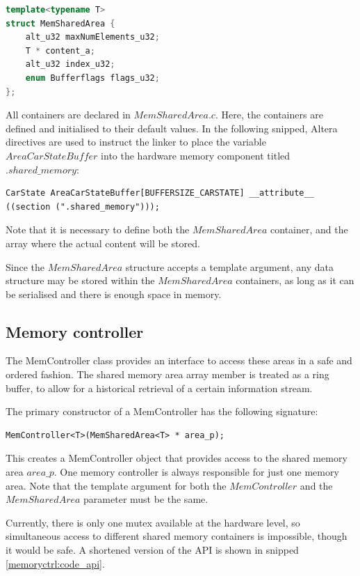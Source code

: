 \begin{lstlisting}[language=C++, label=sharedmem:code_memsharedarea, caption={$MemSharedArea$ structure, the container for shared data. Code found at: $software/ shared\_files/ MemSharedArea.h$}] 
template<typename T>
struct MemSharedArea {
	alt_u32 maxNumElements_u32;
	T * content_a;
	alt_u32 index_u32;
	enum Bufferflags flags_u32;
};
\end{lstlisting}

All containers are declared in $MemSharedArea.c$. Here, the containers are defined and initialised to their default values. In the following snipped, Altera directives are used to instruct the linker to place the variable $AreaCarStateBuffer$ into the hardware memory component titled $.shared\_memory$:
\begin{lstlisting}
CarState AreaCarStateBuffer[BUFFERSIZE_CARSTATE] __attribute__ ((section (".shared_memory")));
\end{lstlisting}
 Note that it is necessary to define both the $MemSharedArea$ container, and the array where the actual content will be stored.

Since the $MemSharedArea$ structure accepts a template argument, any data structure may be stored within the $MemSharedArea$ containers, as long as it can be serialised and there is enough space in memory.

\subsection{Memory controller}
The MemController class provides an interface to access these areas in a safe and ordered fashion. The shared memory area array member is treated as a ring buffer, to allow for a historical retrieval of a certain information stream. 

The primary constructor of a MemController has the following signature:
\begin{lstlisting}
MemController<T>(MemSharedArea<T> * area_p);
\end{lstlisting} 
This creates a MemController object that provides access to the shared memory area $area\_p$. One memory controller is always responsible for just one memory area. Note that the template argument for both the $MemController$ and the $MemSharedArea$ parameter must be the same. 

Currently, there is only one mutex available at the hardware level, so simultaneous access to different shared memory containers is impossible, though it would be safe. A shortened version of the API is shown in snipped \ref{memoryctrl:code_api}.

